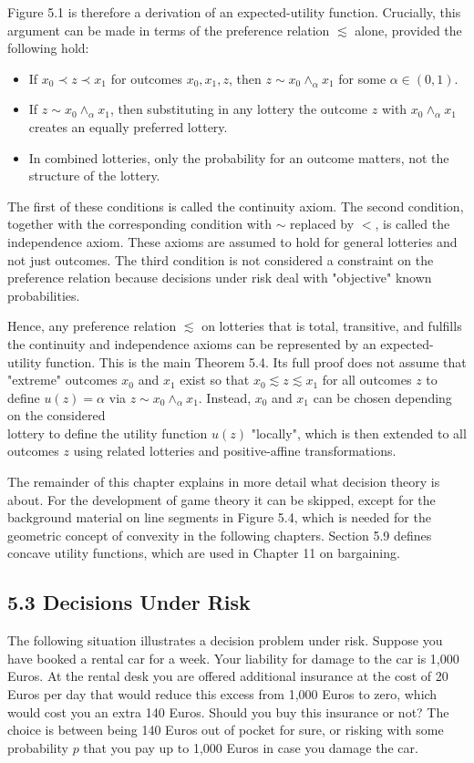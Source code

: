 \documentclass[12pt]{article}
\begin{document}
Figure 5.1 is therefore a derivation of an expected-utility function. Crucially, this argument can be made in terms of the preference relation $\lesssim$ alone, provided the following hold:

\begin{itemize}
  \item If $x_{0} \prec z \prec x_{1}$ for outcomes $x_{0}, x_{1}, z$, then $z \sim x_{0} \wedge_{\alpha} x_{1}$ for some $\alpha \in(0,1)$.
  \item If $z \sim x_{0} \wedge_{\alpha} x_{1}$, then substituting in any lottery the outcome $z$ with $x_{0} \wedge_{\alpha} x_{1}$ creates an equally preferred lottery.
  \item In combined lotteries, only the probability for an outcome matters, not the structure of the lottery.
\end{itemize}

The first of these conditions is called the continuity axiom. The second condition, together with the corresponding condition with $\sim$ replaced by $<$, is called the independence axiom. These axioms are assumed to hold for general lotteries and not just outcomes. The third condition is not considered a constraint on the preference relation because decisions under risk deal with "objective" known probabilities.

Hence, any preference relation $\lesssim$ on lotteries that is total, transitive, and fulfills the continuity and independence axioms can be represented by an expected-utility function. This is the main Theorem 5.4. Its full proof does not assume that "extreme" outcomes $x_{0}$ and $x_{1}$ exist so that $x_{0} \lesssim z \lesssim x_{1}$ for all outcomes $z$ to define $u(z)=\alpha$ via $z \sim x_{0} \wedge_{\alpha} x_{1}$. Instead, $x_{0}$ and $x_{1}$ can be chosen depending on the considered\\
lottery to define the utility function $u(z)$ "locally", which is then extended to all outcomes $z$ using related lotteries and positive-affine transformations.

The remainder of this chapter explains in more detail what decision theory is about. For the development of game theory it can be skipped, except for the background material on line segments in Figure 5.4, which is needed for the geometric concept of convexity in the following chapters. Section 5.9 defines concave utility functions, which are used in Chapter 11 on bargaining.

\subsection*{5.3 Decisions Under Risk}
The following situation illustrates a decision problem under risk. Suppose you have booked a rental car for a week. Your liability for damage to the car is 1,000 Euros. At the rental desk you are offered additional insurance at the cost of 20 Euros per day that would reduce this excess from 1,000 Euros to zero, which would cost you an extra 140 Euros. Should you buy this insurance or not? The choice is between being 140 Euros out of pocket for sure, or risking with some probability $p$ that you pay up to 1,000 Euros in case you damage the car.
\end{document}
